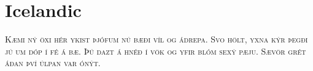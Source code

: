 

\presection\section*{\checkno Icelandic}\postsection

\textsc{Kæmi ný öxi hér ykist þjófum nú bæði víl og ádrepa.
Svo hölt, yxna kýr þegði jú um dóp í fé á bæ. 
Þú dazt á hnéð í vök og yfir blóm sexý pæju.
Sævör grét áðan því úlpan var ónýt.}